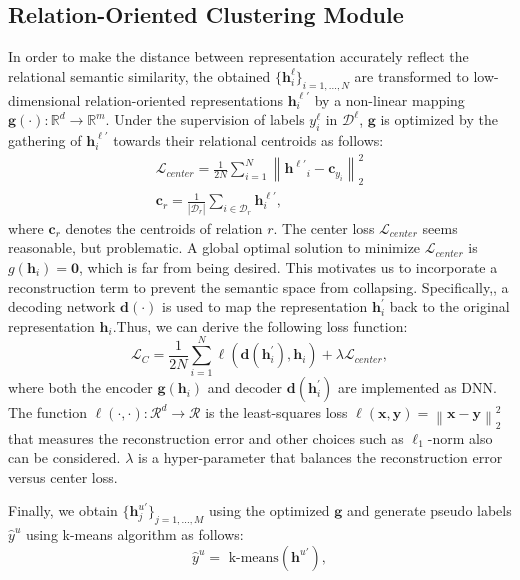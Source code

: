 \documentclass[11pt]{article}
\begin{document}
        \subsection{Relation-Oriented Clustering Module}
In order to make the distance between representation accurately reflect the relational semantic similarity, the obtained $\{\bm{h}^\ell_i\}_{i=1,...,N}$ are transformed to low-dimensional relation-oriented representations $\bm{h}_i^{\ell\prime}$ by a non-linear mapping $\bm{g}(\cdot):\mathbb{R}^d\rightarrow\mathbb{R}^m$. Under the supervision of labels $y_i^\ell$ in $\mathcal{D}^\ell$, $\bm{g}$ is optimized by the gathering of $\bm{h}_i^{\ell\prime}$ towards their relational centroids as follows:
            \begin{gather}
                \mathcal{L}_{center}=\frac{1}{2N}\sum_{i=1}^{N}\left\|\bm{h^{\ell\prime}}_i-\bm{c}_{y_i}\right\|_2^2\\
                \bm{c}_{r}=\frac{1}{|\mathcal{D}_r|}\sum_{i\in \mathcal{D}_r}\bm{h}_i^{\ell\prime},
            \end{gather}
            where $\bm{c}_r$ denotes the centroids of relation $r$. The center loss $\mathcal{L}_{center}$ seems reasonable, but problematic. A global optimal solution to minimize $\mathcal{L}_{center}$ is $g(\bm{h}_i)=\bm{0}$, which is far from being desired. This motivates us to incorporate a reconstruction term to prevent the semantic space from collapsing. Specifically,, a decoding network $\bm{d}(\cdot)$ is used to map the representation $\bm{h}_i^{\prime}$ back to the original representation $\bm{h}_i$.Thus, we can derive the following loss function:
            \begin{equation}
                \mathcal{L}_{C}=\frac{1}{2N}\sum_{i=1}^{N}\ell(\bm{d}(\bm{h}_i^\prime),\bm{h}_i)+\lambda\mathcal{L}_{center},
            \end{equation}
            where both the encoder $\bm{g}(\bm{h}_i)$ and decoder $\bm{d}(\bm{h}_i^\prime)$ are implemented as DNN. The function $\ell(\cdot,\cdot):\mathcal{R}^d\rightarrow \mathcal{R}$ is the least-squares loss $\ell(\bm{x},\bm{y})=\left\|\bm{x}-\bm{y}\right\|_2^2$ that measures the reconstruction error and other choices such as $\ell_1$-norm also can be considered. $\lambda$ is a hyper-parameter that balances the reconstruction error versus center loss.

            Finally, we obtain $\{\bm{h}_j^{u\prime}\}_{j=1,...,M}$ using the optimized $\bm{g}$ and generate pseudo labels $\hat{y}^u$ using k-means algorithm as follows:
            \begin{equation}
                \hat{y}^u=\text{ k-means}(\bm{h}^{u\prime}), \label{equ:plabel}
            \end{equation}
            
\end{document}
